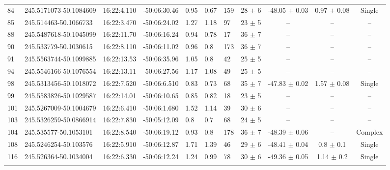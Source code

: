 \begin{table}[htbp!]
\begin{tabular}{llllllllccc}
84  &  245.5171073-50.1084609  &  16:22:4.110  &  -50:06:30.46  &  0.95  &  0.67  &  159  &  28 $\pm$ 6  &  -48.05 $\pm$ 0.03  &  0.97 $\pm$ 0.08  &  Single \\
85  &  245.514463-50.1066733  &  16:22:3.470  &  -50:06:24.02  &  1.27  &  1.18  &  97  &  23 $\pm$ 5  &  --  &  --  &  -- \\
88  &  245.5487618-50.1045099  &  16:22:11.70  &  -50:06:16.24  &  0.94  &  0.78  &  17  &  36 $\pm$ 7  &  --  &  --  &  -- \\
90  &  245.533779-50.1030615  &  16:22:8.110  &  -50:06:11.02  &  0.96  &  0.8  &  173  &  36 $\pm$ 7  &  --  &  --  &  -- \\
91  &  245.5563744-50.1099885  &  16:22:13.53  &  -50:06:35.96  &  1.05  &  0.8  &  42  &  25 $\pm$ 5  &  --  &  --  &  -- \\
94  &  245.5546166-50.1076554  &  16:22:13.11  &  -50:06:27.56  &  1.17  &  1.08  &  49  &  25 $\pm$ 5  &  --  &  --  &  -- \\
98  &  245.5313456-50.1018072  &  16:22:7.520  &  -50:06:6.510  &  0.83  &  0.73  &  68  &  35 $\pm$ 7  &  -47.83 $\pm$ 0.02  &  1.57 $\pm$ 0.08  &  Single \\
99  &  245.5583826-50.1029587  &  16:22:14.01  &  -50:06:10.65  &  0.85  &  0.82  &  18  &  23 $\pm$ 5  &  --  &  --  &  -- \\
101  &  245.5267009-50.1004679  &  16:22:6.410  &  -50:06:1.680  &  1.52  &  1.14  &  39  &  30 $\pm$ 6  &  --  &  --  &  -- \\
103  &  245.5326259-50.0866914  &  16:22:7.830  &  -50:05:12.09  &  0.8  &  0.7  &  68  &  24 $\pm$ 5  &  --  &  --  &  -- \\
104  &  245.535577-50.1053101  &  16:22:8.540  &  -50:06:19.12  &  0.93  &  0.8  &  178  &  36 $\pm$ 7  &  -48.39 $\pm$ 0.06  &  --  &  Complex \\
108  &  245.5246254-50.103576  &  16:22:5.910  &  -50:06:12.87  &  1.71  &  1.39  &  46  &  29 $\pm$ 6  &  -48.41 $\pm$ 0.04  &  0.8 $\pm$ 0.1  &  Single \\
116  &  245.526364-50.1034004  &  16:22:6.330  &  -50:06:12.24  &  1.24  &  0.99  &  78  &  30 $\pm$ 6  &  -49.36 $\pm$ 0.05  &  1.14 $\pm$ 0.2  &  Single \\
\hline \noalign {\smallskip}

\end{tabular}
\end{table}

